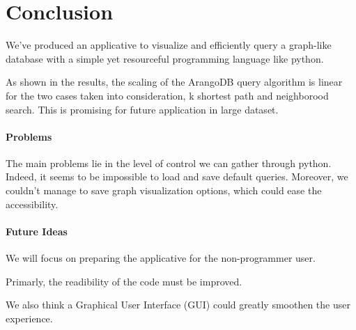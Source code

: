 \documentclass[11pt,twocolumn]{article}
\begin{document}
\section{Conclusion}

We've produced an applicative to visualize and efficiently query a graph-like database with a simple yet resourceful programming language like python.

As shown in the results, the scaling of the ArangoDB query algorithm is linear for the two cases taken into consideration, k shortest path and neighborood search. This is promising for future application in large dataset.

\paragraph{Problems}

The main problems lie in the level of control we can gather through python. Indeed, it seems to be impossible to load and save default queries.
Moreover, we couldn't manage to save graph visualization options, which could ease the accessibility.

\paragraph{Future Ideas} 

We will focus on preparing the applicative for the non-programmer user.

Primarly, the readibility of the code must be improved.

We also think a Graphical User Interface (GUI) could greatly smoothen the user experience. 


\twocolumn[
\begin{@twocolumnfalse}
 

\end{@twocolumnfalse}
]
\end{document}
